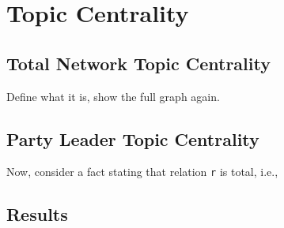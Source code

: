 \section{Topic Centrality}\label{sec:TopicCentrality}

\subsection{Total Network Topic Centrality}\label{sec:NetTopicCentrality}

	Define what it is, show the full graph again.

\subsection{Party Leader Topic Centrality}\label{sec:LeaderCentrality}

    Now, consider a fact stating that relation \texttt{r} is total, i.e.,

\subsection{Results}\label{sec:TopicCentralityResults}
